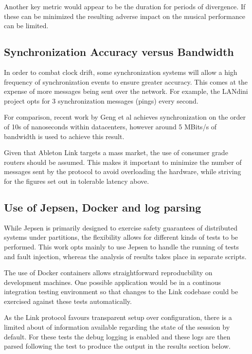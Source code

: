 \documentclass[11pt]{article} %
\theoremstyle{plain}
\theoremstyle{definition}
\begin{document}
Another key metric would appear to be the duration for periods of divergence.
If these can be minimized the resulting adverse impact on the musical
performance can be limited.

\subsection{Synchronization Accuracy versus Bandwidth}

In order to combat clock drift, some synchronization systems will allow a high
frequency of synchronization events to ensure greater accuracy. This comes at
the expense of more messages being sent over the network. For example, the
LANdini project opts for 3 synchronization messages (pings) every second.

For comparison, recent work by Geng et al\cite{geng2018} achieves
synchronization on the order of 10s of nanoseconds within datacenters, however
around 5 MBits/s of bandwidth is used to achieve this result.

Given that Ableton Link targets a mass market, the use of consumer grade
routers should be assumed. This makes it important to minimize the number of
messages sent by the protocol to avoid overloading the hardware, while striving
for the figures set out in tolerable latency above.

\subsection{Use of Jepsen, Docker and log parsing}

While Jepsen is primarily designed to exercise safety guarantees of distributed
systems under partitions, the flexibility allows for different kinds of tests
to be performed. This work opts mainly to use Jepsen to handle the running of
tests and fault injection, whereas the analysis of results takes place in
separate scripts.

The use of Docker containers allows straightforward reproducbility on
development machines. One possible application would be in a continous
integration testing environment so that changes to the Link codebase could be
exercised against these tests automatically.

As the Link protocol favours transparent setup over configuration, there is a
limited about of information available regarding the state of the sesssion by
default. For these tests the debug logging is enabled and these logs are then
parsed following the test to produce the output in the results section below.
\end{document}
